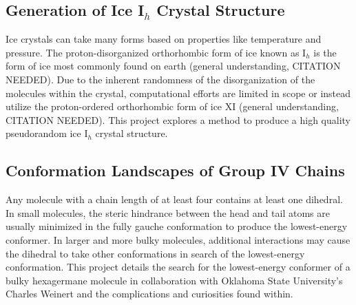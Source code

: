\subsection{Generation of Ice I$_{h}$ Crystal Structure}

Ice crystals can take many forms based on properties like temperature and pressure. 
The proton-disorganized orthorhombic form of ice known as I$_{h}$ is the form of ice most commonly found on earth (general understanding, CITATION NEEDED). 
Due to the inherent randomness of the disorganization of the molecules within the crystal, computational efforts are limited in scope or instead utilize the proton-ordered orthorhombic form of ice XI  (general understanding, CITATION NEEDED).
This project explores a method to produce a high quality pseudorandom ice I$_{h}$ crystal structure.

\subsection{Conformation Landscapes of Group IV Chains}

Any molecule with a chain length of at least four contains at least one dihedral. 
In small molecules, the steric hindrance between the head and tail atoms are usually minimized in the fully gauche conformation to produce the lowest-energy conformer. 
In larger and more bulky molecules, additional interactions may cause the dihedral to take other conformations in search of the lowest-energy conformation. 
This project details the search for the lowest-energy conformer of a bulky hexagermane molecule in collaboration with Oklahoma State University's Charles Weinert and the complications and curiosities found within.

